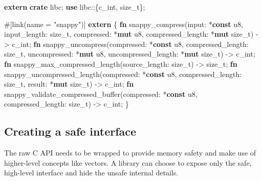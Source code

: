 \documentclass[a4paper,]{book}
\newenvironment{Shaded}{\begin{snugshade}}{\end{snugshade}}
\newcommand{\KeywordTok}[1]{\textcolor[rgb]{0.13,0.29,0.53}{\textbf{{#1}}}}
\newcommand{\DataTypeTok}[1]{\textcolor[rgb]{0.13,0.29,0.53}{{#1}}}
\newcommand{\StringTok}[1]{\textcolor[rgb]{0.31,0.60,0.02}{{#1}}}
\newcommand{\AttributeTok}[1]{\textcolor[rgb]{0.77,0.63,0.00}{{#1}}}
\newcommand{\NormalTok}[1]{{#1}}
\begin{document}
\begin{Shaded}
\begin{Highlighting}[]
\KeywordTok{extern} \KeywordTok{crate} \NormalTok{libc;}
\KeywordTok{use} \NormalTok{libc::\{}\DataTypeTok{c_int}\NormalTok{, }\DataTypeTok{size_t}\NormalTok{\};}

\AttributeTok{#[}\NormalTok{link}\AttributeTok{(}\NormalTok{name }\AttributeTok{=} \StringTok{"snappy"}\AttributeTok{)]}
\KeywordTok{extern} \NormalTok{\{}
    \KeywordTok{fn} \NormalTok{snappy_compress(input: *}\KeywordTok{const} \DataTypeTok{u8}\NormalTok{,}
                       \NormalTok{input_length: }\DataTypeTok{size_t}\NormalTok{,}
                       \NormalTok{compressed: *}\KeywordTok{mut} \DataTypeTok{u8}\NormalTok{,}
                       \NormalTok{compressed_length: *}\KeywordTok{mut} \DataTypeTok{size_t}\NormalTok{) -> }\DataTypeTok{c_int}\NormalTok{;}
    \KeywordTok{fn} \NormalTok{snappy_uncompress(compressed: *}\KeywordTok{const} \DataTypeTok{u8}\NormalTok{,}
                         \NormalTok{compressed_length: }\DataTypeTok{size_t}\NormalTok{,}
                         \NormalTok{uncompressed: *}\KeywordTok{mut} \DataTypeTok{u8}\NormalTok{,}
                         \NormalTok{uncompressed_length: *}\KeywordTok{mut} \DataTypeTok{size_t}\NormalTok{) -> }\DataTypeTok{c_int}\NormalTok{;}
    \KeywordTok{fn} \NormalTok{snappy_max_compressed_length(source_length: }\DataTypeTok{size_t}\NormalTok{) -> }\DataTypeTok{size_t}\NormalTok{;}
    \KeywordTok{fn} \NormalTok{snappy_uncompressed_length(compressed: *}\KeywordTok{const} \DataTypeTok{u8}\NormalTok{,}
                                  \NormalTok{compressed_length: }\DataTypeTok{size_t}\NormalTok{,}
                                  \NormalTok{result: *}\KeywordTok{mut} \DataTypeTok{size_t}\NormalTok{) -> }\DataTypeTok{c_int}\NormalTok{;}
    \KeywordTok{fn} \NormalTok{snappy_validate_compressed_buffer(compressed: *}\KeywordTok{const} \DataTypeTok{u8}\NormalTok{,}
                                         \NormalTok{compressed_length: }\DataTypeTok{size_t}\NormalTok{) -> }\DataTypeTok{c_int}\NormalTok{;}
\NormalTok{\}}
\end{Highlighting}
\end{Shaded}

\subsection{Creating a safe interface}\label{creating-a-safe-interface}

The raw C API needs to be wrapped to provide memory safety and make use
of higher-level concepts like vectors. A library can choose to expose
only the safe, high-level interface and hide the unsafe internal
details.
\end{document}
